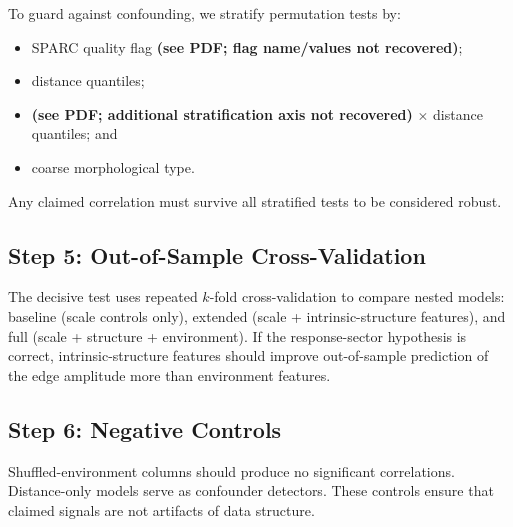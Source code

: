 To guard against confounding, we stratify permutation tests by:
\begin{itemize}
	\item SPARC quality flag \textbf{(see PDF; flag name/values not recovered)};
	\item distance quantiles;
	\item \textbf{(see PDF; additional stratification axis not recovered)} $\times$ distance quantiles; and
	\item coarse morphological type.
\end{itemize}
Any claimed correlation must survive all stratified tests to be considered robust.

\subsection{Step 5: Out-of-Sample Cross-Validation}

The decisive test uses repeated $k$-fold cross-validation to compare nested models: baseline (scale controls only), extended (scale + intrinsic-structure features), and full (scale + structure + environment). If the response-sector hypothesis is correct, intrinsic-structure features should improve out-of-sample prediction of the edge amplitude more than environment features.

\subsection{Step 6: Negative Controls}

Shuffled-environment columns should produce no significant correlations. Distance-only models serve as confounder detectors. These controls ensure that claimed signals are not artifacts of data structure.

